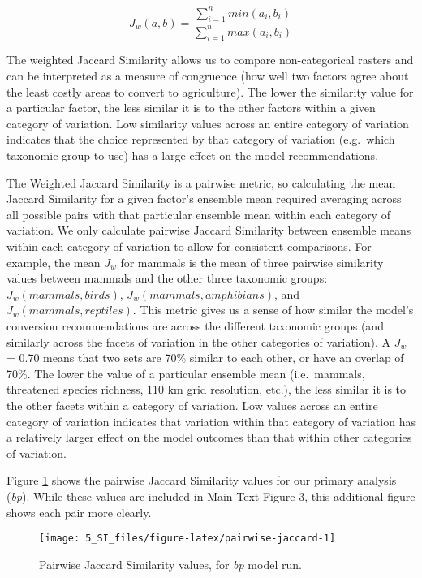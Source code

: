 \documentclass[
]{article}
\begin{document}
\begin{equation}
J_{w} (a,b) = \frac{\sum_{i=1}^n min(a_{i}, b_{i})}{\sum_{i=1}^n max(a_{i}, b_{i})} \label{eq:jac-w}
\end{equation}

The weighted Jaccard Similarity allows us to compare non-categorical rasters and can be interpreted as a measure of congruence (how well two factors agree about the least costly areas to convert to agriculture). The lower the similarity value for a particular factor, the less similar it is to the other factors within a given category of variation. Low similarity values across an entire category of variation indicates that the choice represented by that category of variation (e.g.~which taxonomic group to use) has a large effect on the model recommendations.

The Weighted Jaccard Similarity is a pairwise metric, so calculating the mean Jaccard Similarity for a given factor's ensemble mean required averaging across all possible pairs with that particular ensemble mean within each category of variation. We only calculate pairwise Jaccard Similarity between ensemble means within each category of variation to allow for consistent comparisons. For example, the mean \(J_w\) for mammals is the mean of three pairwise similarity values between mammals and the other three taxonomic groups: \(J_w(mammals, birds)\), \(J_w(mammals,amphibians)\), and \(J_w(mammals,reptiles)\). This metric gives us a sense of how similar the model's conversion recommendations are across the different taxonomic groups (and similarly across the facets of variation in the other categories of variation). A \(J_w\) = 0.70 means that two sets are 70\% similar to each other, or have an overlap of 70\%. The lower the value of a particular ensemble mean (i.e.~mammals, threatened species richness, 110 km grid resolution, etc.), the less similar it is to the other facets within a category of variation. Low values across an entire category of variation indicates that variation within that category of variation has a relatively larger effect on the model outcomes than that within other categories of variation.

Figure \ref{fig:pairwise-jaccard} shows the pairwise Jaccard Similarity values for our primary analysis (\emph{bp}). While these values are included in Main Text Figure 3, this additional figure shows each pair more clearly.



\begin{figure}
\texttt{[image: 5\_SI\_files/figure-latex/pairwise-jaccard-1]} \caption{Pairwise Jaccard Similarity values, for \emph{bp} model run.}\label{fig:pairwise-jaccard}
\end{figure}
\end{document}
